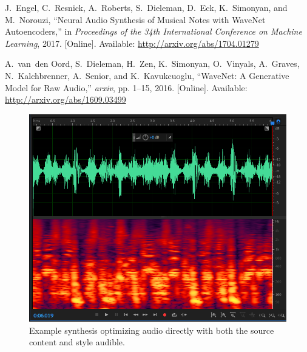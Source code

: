 \documentclass{article}
\begin{document}
\begin{thebibliography}{1}
\BIBentryALTinterwordspacing
J.~Engel, C.~Resnick, A.~Roberts, S.~Dieleman, D.~Eck, K.~Simonyan, and
  M.~Norouzi, ``{Neural Audio Synthesis of Musical Notes with WaveNet
  Autoencoders},'' in \emph{Proceedings of the 34th International Conference on
  Machine Learning}, 2017. [Online]. Available:
  \url{http://arxiv.org/abs/1704.01279}
\BIBentrySTDinterwordspacing

\BIBentryALTinterwordspacing
A.~van~den Oord, S.~Dieleman, H.~Zen, K.~Simonyan, O.~Vinyals, A.~Graves,
  N.~Kalchbrenner, A.~Senior, and K.~Kavukcuoglu, ``{WaveNet: A Generative
  Model for Raw Audio},'' \emph{arxiv}, pp. 1--15, 2016. [Online]. Available:
  \url{http://arxiv.org/abs/1609.03499}
\BIBentrySTDinterwordspacing

\end{thebibliography}

\begin{figure}
\centering
\includegraphics[width=1\linewidth]{synthesis}
\caption{Example synthesis optimizing audio directly with both the source content and style audible.}
\end{figure}
\end{document}
